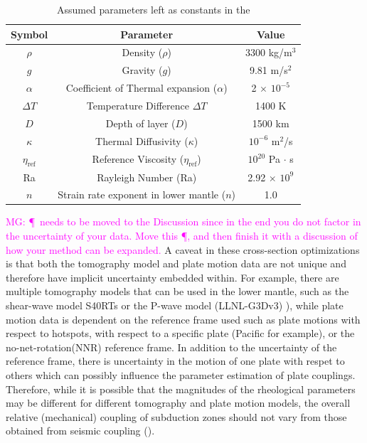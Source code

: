 \documentclass[12pt]{article}
\newcommand{\mgnote}[1]{\textcolor{magenta}{MG: #1}}
\begin{document}
\begin{table}[H]
  \caption{Assumed parameters left as constants in the }
  \centering  %
  \begin{tabular}{c c c} %
    \hline \hline                        %
    Symbol & Parameter & Value  \\ [0.5ex] %
    \hline                  %
    $\rho$ & Density ($\rho$)  & 3300 kg/m$^3$ \\
    $g$ & Gravity ($g$) & 9.81 m/s$^2$ \\
    $\alpha$ & Coefficient of Thermal expansion ($\alpha$) & 2 $\times$ $10^{-5}$ \\ 
    $\Delta T$& Temperature Difference $\Delta T$ & 1400 K \\
    $D$& Depth of layer ($D$) & 1500 km \\
    $\kappa$& Thermal Diffusivity ($\kappa$) & $10^{-6}$  m$^2$/s \\
    $\eta_{\text{ref}}$& Reference Viscosity  ($\eta_{\text{ref}}$) & $10^{20}$ Pa $\cdot$ s \\
    Ra & Rayleigh Number (Ra) & 2.92 $\times$ $10^9$ \\
    $n$ & Strain rate exponent in lower mantle ($n$) & 1.0 \\
    \hline %
  \end{tabular}
  \label{table:parameters} %
\end{table}

\mgnote{\P~needs to be moved to the Discussion since in the end you do not factor in the uncertainty of your data. Move this \P, and then finish it with a discussion of how your method can be expanded.} A caveat in these cross-section optimizations is that both the tomography model and plate motion data are not unique and therefore have implicit uncertainty embedded within. For example, there are multiple tomography models that can be used in the lower mantle, such as the shear-wave model S40RTs \citep{ritsema2011s40rts} or the P-wave model (LLNL-G3Dv3) \citep{simmons2012llnl}), while plate motion data is dependent on the reference frame used such as plate motions with respect to hotspots, with respect to a specific plate (Pacific for example), or the no-net-rotation(NNR) reference frame. 
In addition to the uncertainty of the reference frame, there is uncertainty in the motion of one plate with respet to others which can possibly influence the parameter estimation of plate couplings. Therefore, while it is possible that the magnitudes of the rheological parameters may be different for different tomography and plate motion models, the overall relative (mechanical) coupling of subduction zones should not vary from those obtained from seismic coupling (\citep{scholz2012seismic}).
\end{document}
